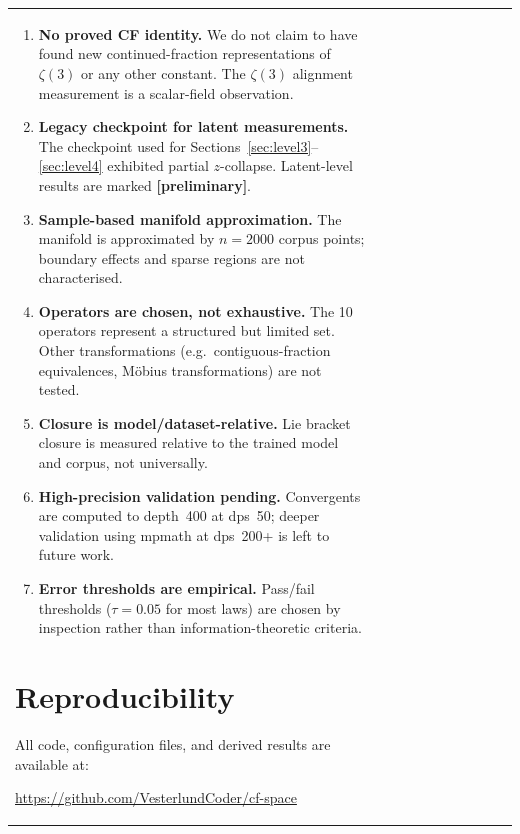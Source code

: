 \documentclass[11pt,a4paper]{article}
\begin{document}
\begin{table}[h]
\begin{tabular}{l|cccccccccc}
\begin{enumerate}[noitemsep]
  \item \textbf{No proved CF identity.} We do not claim to have found new
        continued-fraction representations of $\zeta(3)$ or any other constant.
        The $\zeta(3)$ alignment measurement is a scalar-field observation.
  \item \textbf{Legacy checkpoint for latent measurements.} The checkpoint
        used for Sections~\ref{sec:level3}--\ref{sec:level4} exhibited partial
        $z$-collapse.  Latent-level results are marked \textbf{[preliminary]}.
  \item \textbf{Sample-based manifold approximation.} The manifold is
        approximated by $n=2000$ corpus points; boundary effects and
        sparse regions are not characterised.
  \item \textbf{Operators are chosen, not exhaustive.} The 10 operators
        represent a structured but limited set.  Other transformations
        (e.g.\ contiguous-fraction equivalences, M\"obius transformations)
        are not tested.
  \item \textbf{Closure is model/dataset-relative.} Lie bracket closure is
        measured relative to the trained model and corpus, not universally.
  \item \textbf{High-precision validation pending.} Convergents are computed
        to depth~400 at dps~50; deeper validation using mpmath at dps~200+
        is left to future work.
  \item \textbf{Error thresholds are empirical.} Pass/fail thresholds
        ($\tau = 0.05$ for most laws) are chosen by inspection rather than
        information-theoretic criteria.
\end{enumerate}

\section{Reproducibility}
\label{sec:reproducibility}

All code, configuration files, and derived results are available at:

\begin{center}
\url{https://github.com/VesterlundCoder/cf-space}
\end{center}


\end{tabular}
\end{table}
\end{document}
